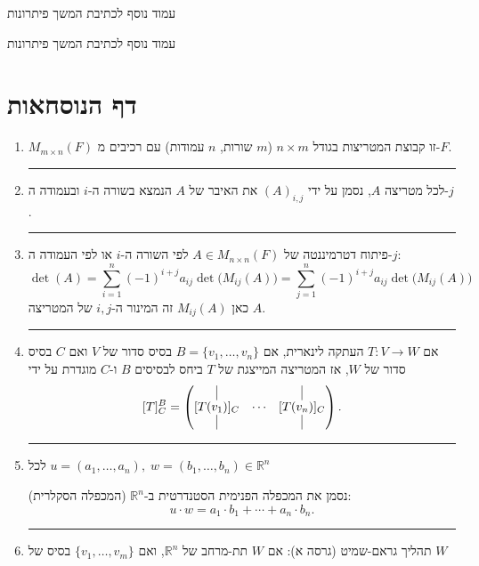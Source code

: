 \documentclass[12pt, a4paper]{article}
\newcommand{\rr}{\mathbb{R}}
\begin{document}
    \pagebreak 
    
    עמוד נוסף לכתיבת המשך פיתרונות
    
    \pagebreak
    עמוד נוסף לכתיבת המשך פיתרונות

 \pagebreak

\section*{דף הנוסחאות}

\begin{enumerate}
\item $M_{m\times n}(F)$ זו קבוצת המטריצות בגודל $n\times m$
($m$ שורות, $n$ עמודות)
עם רכיבים מ-$F$.

\noindent\rule{\textwidth-30pt}{0.4pt}

\item לכל מטריצה $A$, נסמן על ידי $(A)_{i,j}$ את האיבר של $A$ הנמצא בשורה ה-$i$ ובעמודה ה-$j$.

\noindent\rule{\textwidth-30pt}{0.4pt}

\item פיתוח דטרמיננטה של $A\in M_{n\times n}(F)$ לפי השורה ה-$i$ או לפי העמודה ה-$j$:
\[
\det(A)=\sum_{i=1}^{n}(-1)^{i+j}a_{ij}\det\!\big(M_{ij}(A)\big)
=\sum_{j=1}^{n}(-1)^{i+j}a_{ij}\det\!\big(M_{ij}(A)\big)
\]
כאן $M_{ij}(A)$ זה המינור ה-$i,j$ של המטריצה $A$.

\noindent\rule{\textwidth-30pt}{0.4pt}

\item אם $T:V\to W$ העתקה לינארית, אם $B=\{v_1,\ldots,v_n\}$ בסיס סדור של $V$ ואם $C$ בסיס סדור של $W$,
אז המטריצה המייצגת של $T$ ביחס לבסיסים $B$ ו-$C$ מוגדרת על ידי
\[
[T]^B_C=
\begin{pmatrix}
\vline & & \vline\\
[T(v_1)]_C & \cdots & [T(v_n)]_C\\
\vline & & \vline
\end{pmatrix}.
\]

\noindent\rule{\textwidth-30pt}{0.4pt}

\item לכל $u=(a_1,\ldots,a_n),\; w=(b_1,\ldots,b_n)\in\mathbb{R}^n$

נסמן את המכפלה הפנימית הסטנדרטית ב-$\mathbb{R}^n$ (המכפלה הסקלרית):
\[
 u\cdot w=a_1\cdot b_1+\cdots+a_n\cdot b_n.
\]

\noindent\rule{\textwidth-30pt}{0.4pt}



\item תהליך גראם-שמיט (גרסה א):
אם $W$ תת-מרחב של $\rr^n$, ואם $\{v_1,\ldots,v_m\}$ בסיס של $W$


\end{enumerate}
\end{document}
